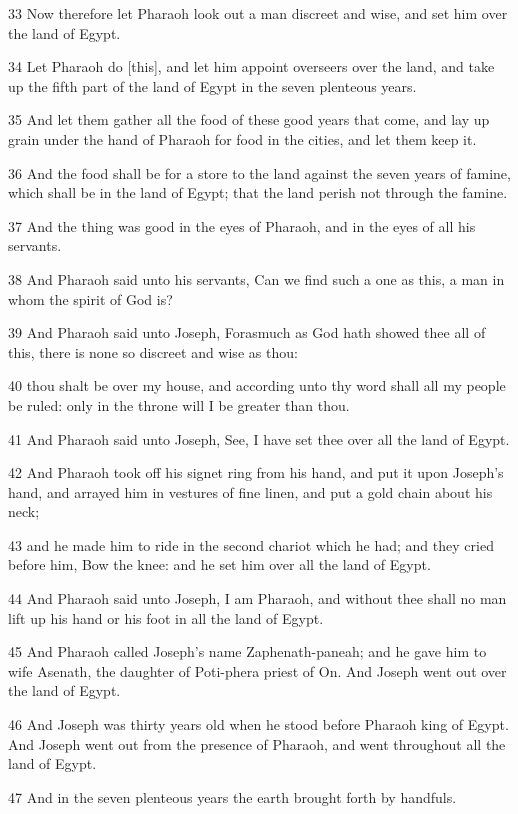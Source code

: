 \par 33 Now therefore let Pharaoh look out a man discreet and wise, and set him over the land of Egypt.
\par 34 Let Pharaoh do [this], and let him appoint overseers over the land, and take up the fifth part of the land of Egypt in the seven plenteous years.
\par 35 And let them gather all the food of these good years that come, and lay up grain under the hand of Pharaoh for food in the cities, and let them keep it.
\par 36 And the food shall be for a store to the land against the seven years of famine, which shall be in the land of Egypt; that the land perish not through the famine.
\par 37 And the thing was good in the eyes of Pharaoh, and in the eyes of all his servants.
\par 38 And Pharaoh said unto his servants, Can we find such a one as this, a man in whom the spirit of God is?
\par 39 And Pharaoh said unto Joseph, Forasmuch as God hath showed thee all of this, there is none so discreet and wise as thou:
\par 40 thou shalt be over my house, and according unto thy word shall all my people be ruled: only in the throne will I be greater than thou.
\par 41 And Pharaoh said unto Joseph, See, I have set thee over all the land of Egypt.
\par 42 And Pharaoh took off his signet ring from his hand, and put it upon Joseph's hand, and arrayed him in vestures of fine linen, and put a gold chain about his neck;
\par 43 and he made him to ride in the second chariot which he had; and they cried before him, Bow the knee: and he set him over all the land of Egypt.
\par 44 And Pharaoh said unto Joseph, I am Pharaoh, and without thee shall no man lift up his hand or his foot in all the land of Egypt.
\par 45 And Pharaoh called Joseph's name Zaphenath-paneah; and he gave him to wife Asenath, the daughter of Poti-phera priest of On. And Joseph went out over the land of Egypt.
\par 46 And Joseph was thirty years old when he stood before Pharaoh king of Egypt. And Joseph went out from the presence of Pharaoh, and went throughout all the land of Egypt.
\par 47 And in the seven plenteous years the earth brought forth by handfuls.

